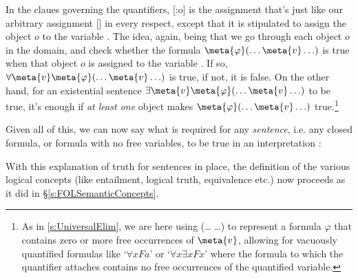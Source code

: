 In the claues governing the quantifiers, [:o] is the assignment that's just like our arbitrary assignment [] in every respect, except that it is stipulated to assign the object $o$ to the variable .  The idea, again, being that we go through each object $o$ in the domain, and check whether the formula $\meta{\varphi}(\ldots \meta{v} \ldots)$ is true when that object $o$ is assigned to the variable .  If so, $\forall \meta{v}\meta{\varphi}(\ldots \meta{v} \ldots)$ is true, if not, it is false.  On the other hand, for an existential sentence $\exists \meta{v}\meta{\varphi}(\ldots \meta{v} \ldots)$ to be true, it's enough if \emph{at least one} object makes $\meta{\varphi}(\ldots \meta{v} \ldots)$ true.\footnote{As in \ref{s:UniversalElim}, we are here using \meta{\varphi}(\ldots {} \ldots) to represent a formula $\varphi$ that contains zero or more free occurrences of $\meta{v}$, allowing for vacuously quantified formulas like `$\forall xFa$' or `$\forall x\exists xFx$' where the formula to which the quantifier attaches contains no free occurrences of the quantified variable.}

Given all of this, we can now say what is required for any \emph{sentence}, i.e. any closed formula, or formula with no free variables, to be true in an interpretation :

With this explanation of truth for sentences in place, the definition of the various logical concepts (like entailment, logical truth, equivalence etc.) now proceeds as it did in \S\ref{s:FOLSemanticConcepts}.
